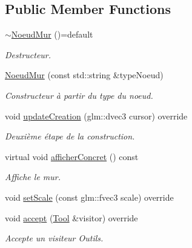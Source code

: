 \subsection*{Public Member Functions}
\begin{DoxyCompactItemize}
\item 
\hypertarget{class_noeud_mur_a8333a4752804a1b5d7fee96e66624b48}{}\hyperlink{class_noeud_mur_a8333a4752804a1b5d7fee96e66624b48}{$\sim$\+Noeud\+Mur} ()=default\label{class_noeud_mur_a8333a4752804a1b5d7fee96e66624b48}

\begin{DoxyCompactList}\small\item\em Destructeur. \end{DoxyCompactList}\end{DoxyCompactItemize}
{\bf }\par
\begin{DoxyCompactItemize}
\item 
\hyperlink{class_noeud_mur_aeab2deec90548c0bdca5eb86beb629cf}{Noeud\+Mur} (const std\+::string \&type\+Noeud)
\begin{DoxyCompactList}\small\item\em Constructeur à partir du type du noeud. \end{DoxyCompactList}\item 
void \hyperlink{class_noeud_mur_a9f86d3ce3675f79abe879143e6dd4e8b}{update\+Creation} (glm\+::dvec3 cursor) override
\begin{DoxyCompactList}\small\item\em Deuxième étape de la construction. \end{DoxyCompactList}\item 
virtual void \hyperlink{class_noeud_mur_a521a3062875ea6ed1645485412a70c7b}{afficher\+Concret} () const 
\begin{DoxyCompactList}\small\item\em Affiche le mur. \end{DoxyCompactList}\item 
void \hyperlink{class_noeud_mur_a8934e4b68543af4da6f06895ec91d9ef}{set\+Scale} (const glm\+::fvec3 scale) override
\item 
\hypertarget{class_noeud_mur_a267fe3fba8110e59fa76412f788ea8d1}{}void \hyperlink{class_noeud_mur_a267fe3fba8110e59fa76412f788ea8d1}{accept} (\hyperlink{class_tool}{Tool} \&visitor) override\label{class_noeud_mur_a267fe3fba8110e59fa76412f788ea8d1}

\begin{DoxyCompactList}\small\item\em Accepte un visiteur Outils. \end{DoxyCompactList}\end{DoxyCompactItemize}

